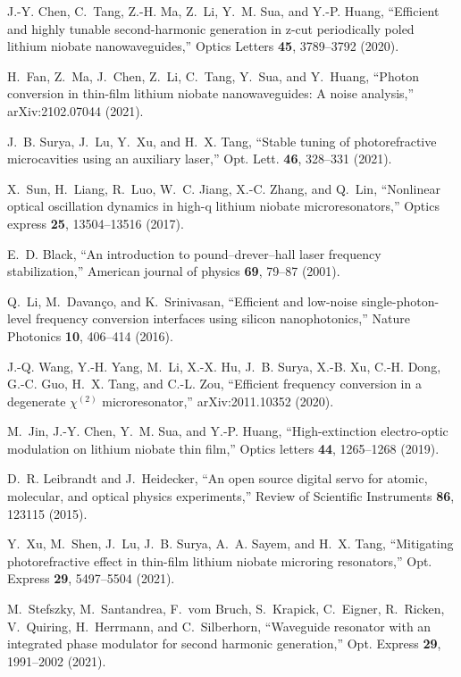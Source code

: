 \documentclass{WileyMSP-template}
\begin{document}
\begin{thebibliography}{10}
J.-Y. Chen, C.~Tang, Z.-H. Ma, Z.~Li, Y.~M. Sua, and Y.-P. Huang,
  \enquote{Efficient and highly tunable second-harmonic generation in z-cut
  periodically poled lithium niobate nanowaveguides,}
  {{Optics Letters}} \textbf{45}, 3789--3792 (2020).

H.~Fan, Z.~Ma, J.~Chen, Z.~Li, C.~Tang, Y.~Sua, and Y.~Huang, \enquote{Photon
  conversion in thin-film lithium niobate nanowaveguides: A noise analysis,}
  {{arXiv:2102.07044}}  (2021).

J.~B. Surya, J.~Lu, Y.~Xu, and H.~X. Tang, \enquote{Stable tuning of
  photorefractive microcavities using an auxiliary laser,}
  {{Opt. Lett.}} \textbf{46}, 328--331 (2021).

X.~Sun, H.~Liang, R.~Luo, W.~C. Jiang, X.-C. Zhang, and Q.~Lin,
  \enquote{Nonlinear optical oscillation dynamics in high-q lithium niobate
  microresonators,} {{Optics express}} \textbf{25},
  13504--13516 (2017).

E.~D. Black, \enquote{An introduction to pound--drever--hall laser frequency
  stabilization,} {{American journal of physics}}
  \textbf{69}, 79--87 (2001).

Q.~Li, M.~Davan{\c{c}}o, and K.~Srinivasan, \enquote{Efficient and low-noise
  single-photon-level frequency conversion interfaces using silicon
  nanophotonics,} {{Nature Photonics}} \textbf{10},
  406--414 (2016).

J.-Q. Wang, Y.-H. Yang, M.~Li, X.-X. Hu, J.~B. Surya, X.-B. Xu, C.-H. Dong,
  G.-C. Guo, H.~X. Tang, and C.-L. Zou, \enquote{Efficient frequency conversion
  in a degenerate $\chi^{(2)}$ microresonator,}
  {{arXiv:2011.10352}}  (2020).

M.~Jin, J.-Y. Chen, Y.~M. Sua, and Y.-P. Huang, \enquote{High-extinction
  electro-optic modulation on lithium niobate thin film,}
  {{Optics letters}} \textbf{44}, 1265--1268 (2019).

D.~R. Leibrandt and J.~Heidecker, \enquote{An open source digital servo for
  atomic, molecular, and optical physics experiments,}
  {{Review of Scientific Instruments}} \textbf{86}, 123115
  (2015).

Y.~Xu, M.~Shen, J.~Lu, J.~B. Surya, A.~A. Sayem, and H.~X. Tang,
  \enquote{Mitigating photorefractive effect in thin-film lithium niobate
  microring resonators,} {{Opt. Express}} \textbf{29},
  5497--5504 (2021).

M.~Stefszky, M.~Santandrea, F.~vom Bruch, S.~Krapick, C.~Eigner, R.~Ricken,
  V.~Quiring, H.~Herrmann, and C.~Silberhorn, \enquote{Waveguide resonator with
  an integrated phase modulator for second harmonic generation,}
  {{Opt. Express}} \textbf{29}, 1991--2002 (2021).

\end{thebibliography}
\end{document}
